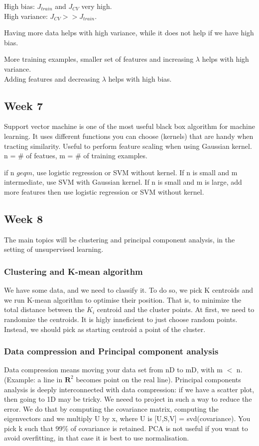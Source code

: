 \documentclass{article}
\begin{document}
High bias: $J_{train}$ and $J_{CV}$ very high. \\
High variance: $J_{CV} >> J_{train}$.

Having more data helps with high variance, while it does not help if we have
high bias.

More training examples, smaller set of features and increasing $\lambda$ helps
with high variance. \\
Adding features and decreasing $\lambda$ helps with high bias.

\subsection{Week 7}
Support vector machine is one of the most useful black box algorithm for machine
learning. It uses different functions you can choose (kernels) that are handy
when tracting similarity. Useful to perform feature scaling when using Gaussian
kernel. n = \# of featues, m = \# of training examples.

if n $geq m$, use logistic regression or SVM without kernel.
If n is small and m intermediate, use SVM with Gaussian kernel.
If n is small and m is large, add more features then use logistic regression or
SVM without kernel.

\subsection{Week 8}
The main topics will be clustering and principal component analysis, in the
setting of unsupervised learning.

\subsubsection{Clustering and K-mean algorithm}
We have some data, and we need to classify it. To do so, we pick K centroids and
we run K-mean algorithm to optimise their position. That is, to minimize the
total distance between the $K_i$ centroid and the cluster points. At first,
we need to randomize the centroids. It is higly inneficient to just choose random
points. Instead, we should pick as starting centroid a point of the cluster.

\subsubsection{Data compression and Principal component analysis}

Data compression means moving your data set from nD to mD, with m $<$ n.
(Example: a line in $\mathbf{R}^2$ becomes point on the real line).
Principal components analysis is deeply interconnected with data compression:
if we have a scatter plot, then going to 1D may be tricky.
We neeed to project in such a way to reduce the error.
We do that by computing the covariance matrix, computing the eigenvectors and we
multiply U by x, where U is [U,S,V] = svd(covariance). You pick k such that
99\% of covariance is retained.
PCA is not useful if you want to avoid overfitting, in that case it is best to
use normalisation.
\end{document}
